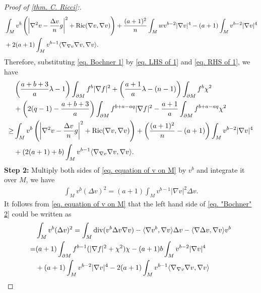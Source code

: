 \documentclass[12pt]{amsart}%
\numberwithin{equation}{section}
\numberwithin{lemma}{section}
\numberwithin{proposition}{section}
\numberwithin{corollary}{section}
\numberwithin{remark}{section}
\begin{document}
\begin{proof}[Proof of \cref{thm. C. Ricci}:]
    \begin{align}\label{eq. RHS of 1}
         &\int_M v^b\left(
        \left|\nabla^2 v-\frac{\Delta v}{n}g\right|^2
        +\mathrm{Ric}(\nabla v,\nabla v)
        \right)
        +\frac{(a+1)^2}{n}\int_M w v^{b-2}|\nabla v|^4
        -(a+1)\int_M v^{b-2}|\nabla v|^4\notag\\
        &+2(a+1)\int_M v^{b-1}\langle\nabla_{\nabla v}\nabla v,\nabla v\rangle.
    \end{align}
    Therefore, substituting \cref{eq. Bochner 1} by \cref{eq. LHS of 1} and \cref{eq. RHS of 1}, we have
    \begin{align}\label{eq. equation 1}
        &\left(\frac{a+b+3}{a}\lambda-1\right)
        \int_{\partial M}f^b|\nabla f|^2
        +\left(\frac{a+1}{a}\lambda-(n-1)\right)
        \int_{\partial M}f^b\chi^2\notag\\
        &+\left(2(q-1)-\frac{a+b+3}{a}\right)\int_{\partial M}f^{b+a-aq}|\nabla f|^2\notag
        -\frac{a+1}{a}\int_{\partial M}f^{b+a-aq}\chi^2\\
        \geq & \int_M v^b\left(
        \left|\nabla^2 v-\frac{\Delta v}{n}g\right|^2
        +\mathrm{Ric}(\nabla v,\nabla v)
        \right)
        +\left(\frac{(a+1)^2}{n}-(a+1)\right)\int_M v^{b-2}|\nabla v|^4\notag\\
        &+(2(a+1)+b)\int_M v^{b-1}\langle\nabla_{\nabla v}\nabla v,\nabla v\rangle.
    \end{align}
    \textbf{Step 2:} Multiply both sides of \cref{eq. equation of v on M} by $v^b$ and integrate it over $M$, we  have
    \begin{align}\label{eq. "Bochner" 2}
        \int_{M}v^b(\Delta v)^2
        =(a+1)\int_M v^{b-1}|\nabla v|^2\Delta v
        .
    \end{align}
    It follows from \cref{eq. equation of v on M} that the left hand side of \cref{eq. "Bochner" 2} could be written as
    \begin{align}\label{eq. LHS of 2}
        &\int_{M}v^b(\Delta v)^2
        =\int_M \mathrm{div}(v^b\Delta v\nabla v)
        -\langle \nabla v^b,\nabla v\rangle\Delta v
        -\langle\nabla \Delta v,\nabla v\rangle v^b\notag\\
        =&(a+1)\int_{\partial M}f^{b-1}(|\nabla f|^2+\chi^2)\chi
        -(a+1)b\int_Mv^{b-2}|\nabla v|^4\notag\\
       & +(a+1)\int_M v^{b-2}|\nabla v|^4
        -2(a+1)\int_M v^{b-1}\langle\nabla_{\nabla v}\nabla v,\nabla v\rangle\notag\\

\end{align}
\end{proof}
\end{document}
